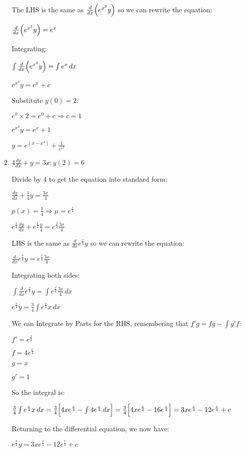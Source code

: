 \documentclass[../main.tex]{subfiles}
\begin{document}
\begin{enumerate}[itemsep=0.7cm]
    The LHS is the same as $\frac{d}{dx}\Bigl(e^{x^3}y\Bigr)$ so we can rewrite the equation:

    $\frac{d}{dx}\Bigl(e^{x^3}y\Bigr)=e^x$

    Integrating:

    $\int \frac{d}{dx}\Bigl(e^{x^3}y\Bigr)=\int e^x\,dx$

    $e^{x^3}y=e^x +c$

    Substitute $y(0)=2$:

    $e^0\times 2=e^0+c \Rightarrow c=1$

    $e^{x^3}y=e^x +1$

    $y=e^{(x-x^3)}+\frac{1}{e^{x^3}}$

    \item 
    $4\frac{dy}{dx}+y=3x; y(2)=6$

    Divide by 4 to get the equation into standard form:

    $\frac{dy}{dx}+\frac{1}{4}y=\frac{3x}{4}$

    $p(x)=\frac{1}{4} \Rightarrow \mu=e^{\frac{x}{4}}$

    $e^{\frac{x}{4}}\frac{dy}{dx}+e^{\frac{x}{4}}\frac{y}{4}=e^{\frac{x}{4}}\frac{3x}{4}$

    LHS is the same as $\frac{d}{dx}e^{\frac{x}{4}}y$ so we can rewrite the equation:

    $\frac{d}{dx}e^{\frac{x}{4}}y=e^{\frac{x}{4}}\frac{3x}{4}$

    Integrating both sides:

    $\int \frac{d}{dx}e^{\frac{x}{4}}y=\int e^{\frac{x}{4}}\frac{3x}{4}\,dx$

    $e^{\frac{x}{4}}y=\frac{3}{4}\int e^{\frac{x}{4}}x\,dx$

    We can Integrate by Parts for the RHS, remembering that $f'g=fg-\int g'f$:

    $f'=e^{\frac{x}{4}}$

    $f=4e^{\frac{x}{4}}$

    $g=x$

    $g'=1$

    So the integral is:
    
    $\frac{3}{4}\int e^{\frac{x}{4}}x\,dx=\frac{3}{4}\Bigl[4xe^{\frac{x}{4}}-\int 4e^{\frac{x}{4}}\,dx\Bigr]=\frac{3}{4}\Bigl[4xe^{\frac{x}{4}}-16e^{\frac{x}{4}}\Bigr]=3xe^{\frac{x}{4}}-12e^{\frac{x}{4}}+c$

    Returning to the differential equation, we now have:

    $e^{\frac{x}{4}}y=3xe^{\frac{x}{4}}-12e^{\frac{x}{4}}+c$


\end{enumerate}
\end{document}
